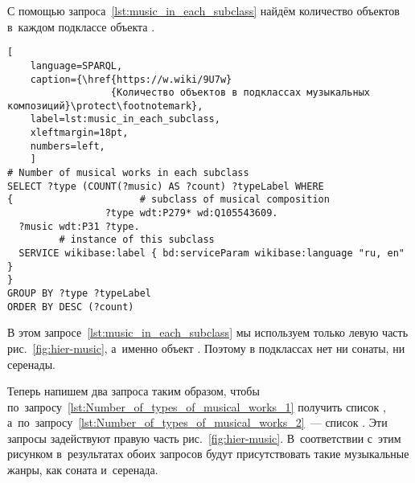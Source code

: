 С помощью запроса~\ref{lst:music_in_each_subclass} найдём количество объектов 
в~каждом подклассе объекта . 

\begin{lstlisting}[ 
    language=SPARQL,
    caption={\href{https://w.wiki/9U7w}
                  {Количество объектов в подклассах музыкальных композиций}\protect\footnotemark},
    label=lst:music_in_each_subclass,
    xleftmargin=18pt,
    numbers=left,
    ]
# Number of musical works in each subclass
SELECT ?type (COUNT(?music) AS ?count) ?typeLabel WHERE 
{                      # subclass of musical composition
                 ?type wdt:P279* wd:Q105543609.      
  ?music wdt:P31 ?type.
         # instance of this subclass
  SERVICE wikibase:label { bd:serviceParam wikibase:language "ru, en" }
}
GROUP BY ?type ?typeLabel
ORDER BY DESC (?count)
\end{lstlisting}%


В этом запросе~\ref{lst:music_in_each_subclass} 
мы используем только левую часть рис.~\ref{fig:hier-music}, 
а~именно объект . 
Поэтому в подклассах нет ни сонаты, ни серенады.

Теперь напишем два запроса таким образом, 
чтобы по~запросу~\ref{lst:Number_of_types_of_musical_works_1} получить 
список , 
а~по~запросу~\ref{lst:Number_of_types_of_musical_works_2}~--- 
список . 
Эти запросы задействуют правую часть рис.~\ref{fig:hier-music}. 
В~соответствии с~этим рисунком в~результатах обоих запросов будут присутствовать такие 
музыкальные жанры, как соната и~серенада.

